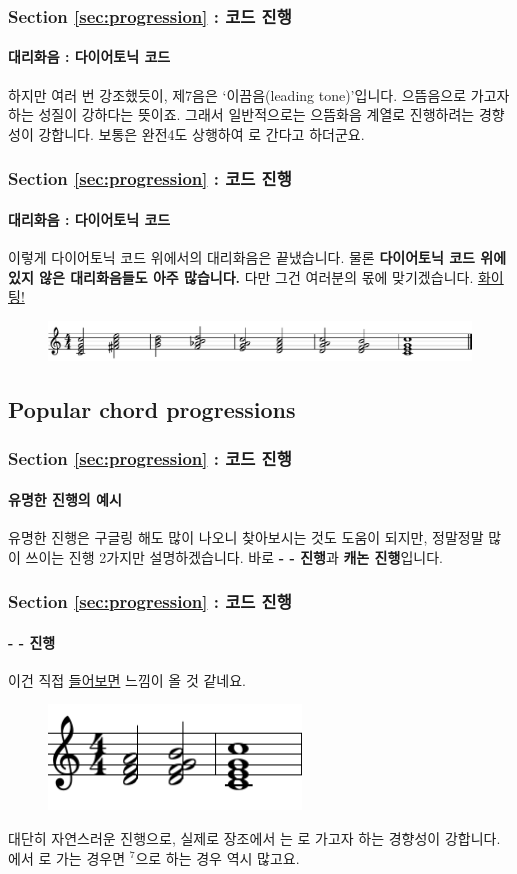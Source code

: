\documentclass{beamer}
\newcommand{\Rn}[1]{%
	\textup{\uppercase\expandafter{\romannumeral#1}}%
}
\newcommand{\rn}[1]{%
	\textup{\lowercase\expandafter{\romannumeral#1}}%
}
\begin{document}
	\begin{frame}
		\frametitle{Section \ref{sec:progression} : 코드 진행}
		\framesubtitle{대리화음 : 다이어토닉 코드}
		하지만 여러 번 강조했듯이, 제7음은 `이끔음(leading tone)'입니다. 으뜸음으로 가고자 하는 성질이 강하다는 뜻이죠. 그래서 일반적으로는 으뜸화음 계열로 진행하려는 경향성이 강합니다. 보통은 완전4도 상행하여 \rn{3}로 간다고 하더군요.
	\end{frame}
	
	\begin{frame}
		\frametitle{Section \ref{sec:progression} : 코드 진행}
		\framesubtitle{대리화음 : 다이어토닉 코드}
		이렇게 다이어토닉 코드 위에서의 대리화음은 끝냈습니다. 물론 {\bf 다이어토닉 코드 위에 있지 않은 대리화음들도 아주 많습니다.} 다만 그건 여러분의 몫에 맞기겠습니다. {\color{cyan}\href{run:res/mp3/11/progression/substitute_non_diatonic.mp3}{화이팅!}}
		\begin{figure}
			\centering
			\includegraphics[width=\textwidth]{res/pdf/11/progression/substitute_non_diatonic.pdf}
		\end{figure}
	\end{frame}
	
	\subsection{Popular chord progressions}
	\begin{frame}
		\frametitle{Section \ref{sec:progression} : 코드 진행}
		\framesubtitle{유명한 진행의 예시}
		유명한 진행은 구글링 해도 많이 나오니 찾아보시는 것도 도움이 되지만, 정말정말 많이 쓰이는 진행 2가지만 설명하겠습니다. 바로 {\bf \rn{2}-\Rn{5}-\Rn{1} 진행}과 {\bf 캐논 진행}입니다.
	\end{frame}
	
	\begin{frame}
		\frametitle{Section \ref{sec:progression} : 코드 진행}
		\framesubtitle{\rn{2}-\Rn{5}-\Rn{1} 진행}
		이건 직접 {\color{cyan}\href{run:res/mp3/11/progression/2_5_1_progression.mp3}{들어보면}} 느낌이 올 것 같네요. 
		\begin{figure}
			\centering
			\includegraphics[width=0.6\textwidth]{res/pdf/11/progression/2_5_1_progression.pdf}
		\end{figure}
		대단히 자연스러운 진행으로, 실제로 장조에서 \rn{2}는 \Rn{5}로 가고자 하는 경향성이 강합니다. \Rn{5}에서 \Rn{1}로 가는 경우면 \Rn{5}$^7$으로 하는 경우 역시 많고요.
	\end{frame}
	
\end{document}

